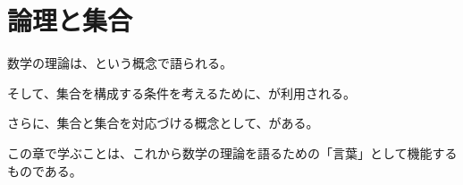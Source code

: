 \documentclass[../imaging-math]{subfiles}
\begin{document}
\chapter{論理と集合}

数学の理論は、という概念で語られる。

そして、集合を構成する条件を考えるために、が利用される。

さらに、集合と集合を対応づける概念として、がある。

\br

この章で学ぶことは、これから数学の理論を語るための「言葉」として機能するものである。



\end{document}
